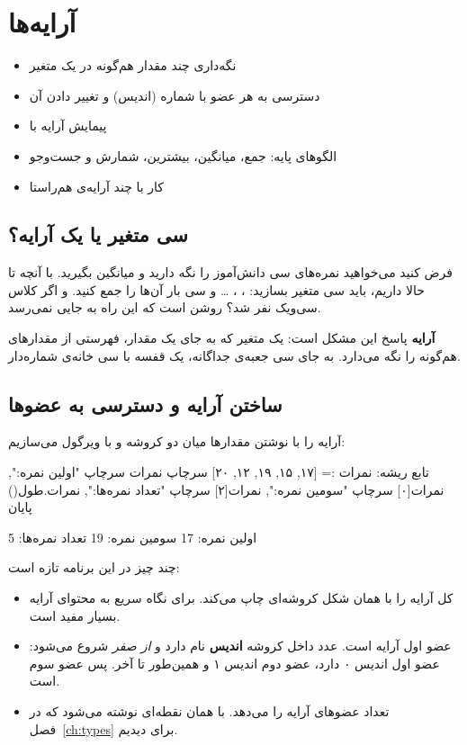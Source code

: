\chapter{آرایه‌ها}\label{ch:arrays}

\begin{goals}
\begin{itemize}
  \item نگه‌داری چند مقدار هم‌گونه در یک متغیر
  \item دسترسی به هر عضو با شماره (اندیس) و تغییر دادن آن
  \item پیمایش آرایه با 
  \item الگوهای پایه: جمع، میانگین، بیشترین، شمارش و جست‌وجو
  \item کار با چند آرایه‌ی هم‌راستا
\end{itemize}
\end{goals}

\section{سی متغیر یا یک آرایه؟}

فرض کنید می‌خواهید نمره‌های سی دانش‌آموز را نگه دارید و میانگین بگیرید.
با آنچه تا حالا داریم، باید سی متغیر بسازید: ، ،
\ldots{} و سی بار آن‌ها را جمع کنید. و اگر کلاس سی‌ویک نفر شد؟ روشن است که این
راه به جایی نمی‌رسد.

\textbf{آرایه} پاسخ این مشکل است: یک متغیر که به جای یک مقدار، فهرستی از
مقدارهای هم‌گونه را نگه می‌دارد. به جای سی جعبه‌ی جداگانه، یک قفسه با سی
خانه‌ی شماره‌دار.

\section{ساختن آرایه و دسترسی به عضوها}

آرایه را با نوشتن مقدارها میان دو کروشه و با ویرگول می‌سازیم:

\begin{salamfa}
تابع ریشه:
    نمرات := [۱۷, ۱۵, ۱۹, ۱۲, ۲۰]
    سرچاپ نمرات
    سرچاپ "اولین نمره:", نمرات[۰]
    سرچاپ "سومین نمره:", نمرات[۲]
    سرچاپ "تعداد نمره‌ها:", نمرات.طول()
پایان
\end{salamfa}

\begin{outputfa}
[17, 15, 19, 12, 20]
اولین نمره: 17
سومین نمره: 19
تعداد نمره‌ها: 5
\end{outputfa}

چند چیز در این برنامه تازه است:
\begin{itemize}
  \item {} کل آرایه را با همان شکل کروشه‌ای چاپ می‌کند.
        برای نگاه سریع به محتوای آرایه بسیار مفید است.
  \item {} عضو اول آرایه است. عدد داخل کروشه \textbf{اندیس}
        نام دارد و \emph{از صفر} شروع می‌شود: عضو اول اندیس ۰ دارد، عضو
        دوم اندیس ۱ و همین‌طور تا آخر. پس  عضو سوم است.
  \item {} تعداد عضوهای آرایه را می‌دهد. با همان نقطه‌ای
        نوشته می‌شود که در فصل~\ref{ch:types} برای  دیدیم.
\end{itemize}

